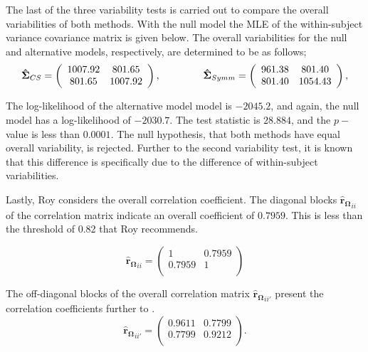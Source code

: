 \documentclass[12pt, a4paper]{report}
\theoremstyle{plain}
\theoremstyle{definition}
\theoremstyle{remark}
\begin{document}
The last of the three variability tests is carried out to compare the overall variabilities of both methods.
With the null model the MLE of the within-subject variance covariance matrix is given below. The overall variabilities for the null and alternative models, respectively, are determined to be as follows;
\[
\boldsymbol{\hat{\Sigma}}_{CS} = \left( \begin{array}{cc}
1007.92  & 801.65  \\
801.65  & 1007.92  \\
\end{array}\right),
\hspace{1.5cm}
\boldsymbol{\hat{\Sigma}}_{Symm} = \left( \begin{array}{cc}
961.38 & 801.40  \\
801.40 & 1054.43  \\
\end{array}\right),
\]
	
The log-likelihood of the alternative model model is $-2045.2$, and again, the null model has a log-likelihood of $-2030.7$. The test statistic is $28.884$, and the $p-$value is less than $0.0001$. The null hypothesis, that both methods have equal overall variability, is rejected. Further to the second variability test, it is known that this difference is specifically due to the difference of within-subject variabilities.

Lastly, Roy considers the overall correlation coefficient. The diagonal blocks $\boldsymbol{\hat{r}_{\Omega}}_{ii}$ of the correlation matrix indicate an overall coefficient of $0.7959$. This is less than the threshold of 0.82 that Roy recommends.


\begin{equation}
\boldsymbol{\hat{r}_{\Omega}}_{ii} = \left( \begin{array}{cc}
1  & 0.7959  \\
0.7959  & 1  \\
\end{array}\right)
\end{equation}
	
	The off-diagonal blocks of the overall correlation matrix $\boldsymbol{\hat{r}_{\Omega}}_{ii'}$ present the correlation coefficients further to \citet{hamlett}.
	\[
	\boldsymbol{\hat{r}_{\Omega}}_{ii'} = \left( \begin{array}{cc}
	0.9611  & 0.7799  \\
	0.7799  & 0.9212  \\
	\end{array}\right).
	\]
	
\end{document}
